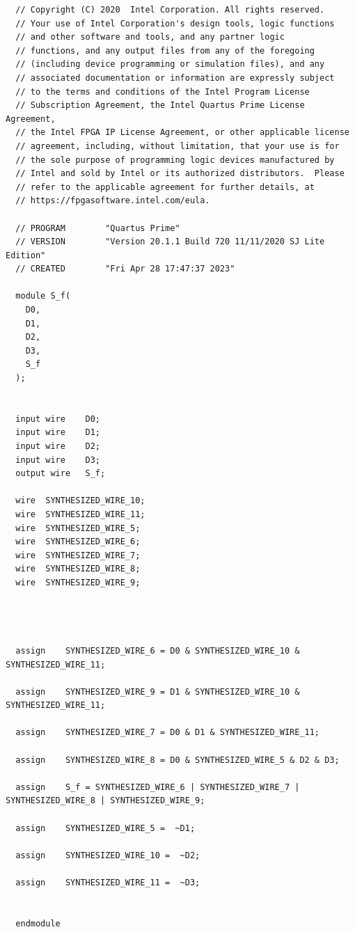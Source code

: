 \documentclass{article}
\begin{document}
\begin{lstlisting}
  // Copyright (C) 2020  Intel Corporation. All rights reserved.
  // Your use of Intel Corporation's design tools, logic functions 
  // and other software and tools, and any partner logic 
  // functions, and any output files from any of the foregoing 
  // (including device programming or simulation files), and any 
  // associated documentation or information are expressly subject 
  // to the terms and conditions of the Intel Program License 
  // Subscription Agreement, the Intel Quartus Prime License Agreement,
  // the Intel FPGA IP License Agreement, or other applicable license
  // agreement, including, without limitation, that your use is for
  // the sole purpose of programming logic devices manufactured by
  // Intel and sold by Intel or its authorized distributors.  Please
  // refer to the applicable agreement for further details, at
  // https://fpgasoftware.intel.com/eula.
  
  // PROGRAM		"Quartus Prime"
  // VERSION		"Version 20.1.1 Build 720 11/11/2020 SJ Lite Edition"
  // CREATED		"Fri Apr 28 17:47:37 2023"
  
  module S_f(
    D0,
    D1,
    D2,
    D3,
    S_f
  );
  
  
  input wire	D0;
  input wire	D1;
  input wire	D2;
  input wire	D3;
  output wire	S_f;
  
  wire	SYNTHESIZED_WIRE_10;
  wire	SYNTHESIZED_WIRE_11;
  wire	SYNTHESIZED_WIRE_5;
  wire	SYNTHESIZED_WIRE_6;
  wire	SYNTHESIZED_WIRE_7;
  wire	SYNTHESIZED_WIRE_8;
  wire	SYNTHESIZED_WIRE_9;
  
  
  
  
  assign	SYNTHESIZED_WIRE_6 = D0 & SYNTHESIZED_WIRE_10 & SYNTHESIZED_WIRE_11;
  
  assign	SYNTHESIZED_WIRE_9 = D1 & SYNTHESIZED_WIRE_10 & SYNTHESIZED_WIRE_11;
  
  assign	SYNTHESIZED_WIRE_7 = D0 & D1 & SYNTHESIZED_WIRE_11;
  
  assign	SYNTHESIZED_WIRE_8 = D0 & SYNTHESIZED_WIRE_5 & D2 & D3;
  
  assign	S_f = SYNTHESIZED_WIRE_6 | SYNTHESIZED_WIRE_7 | SYNTHESIZED_WIRE_8 | SYNTHESIZED_WIRE_9;
  
  assign	SYNTHESIZED_WIRE_5 =  ~D1;
  
  assign	SYNTHESIZED_WIRE_10 =  ~D2;
  
  assign	SYNTHESIZED_WIRE_11 =  ~D3;
  
  
  endmodule
  
\end{lstlisting}
\end{document}
